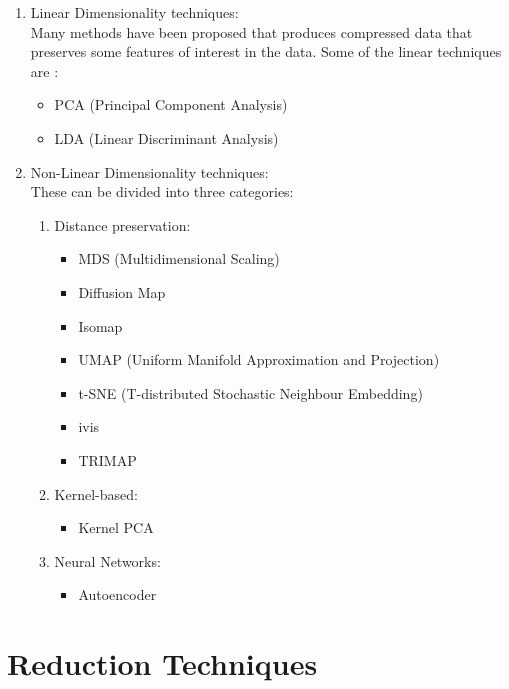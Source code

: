 \documentclass[letterpaper, 10 pt, conference]{ieeeconf}  %
\begin{document}
\begin{enumerate}
	\item Linear Dimensionality techniques: \\
	Many methods have been proposed that produces compressed data that preserves some features of interest in the data. Some of the linear techniques are :
		\begin{itemize}
			\item PCA (Principal Component Analysis)
			\item LDA (Linear Discriminant Analysis)
		\end{itemize}
	\item Non-Linear Dimensionality techniques: \\
	These can be divided into three categories:
		\begin{enumerate}
			\item Distance preservation:
				\begin{itemize}
					\item MDS (Multidimensional Scaling)
					\item Diffusion Map
					\item Isomap
					\item UMAP (Uniform Manifold Approximation and Projection)
					\item t-SNE (T-distributed Stochastic Neighbour Embedding)
					\item ivis 
					\item TRIMAP
				\end{itemize}
			\item Kernel-based: 
					\begin{itemize}
						\item Kernel PCA
					\end{itemize}
			\item Neural Networks: 
					\begin{itemize}
						\item Autoencoder
					\end{itemize}
		\end{enumerate}
\end{enumerate}


\section{Reduction Techniques}
\end{document}
